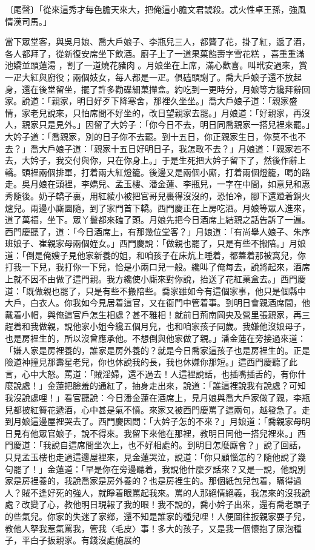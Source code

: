 \begin{showcontents}{}
〔尾聲〕「從來這秀才每色膽天來大，把俺這小膽文君諕殺。忒火性卓王孫，強風情漢司馬。」

當下眾堂客，與吳月娘、喬大戶娘子、李瓶兒三人，都籫了花，掛了紅，遞了酒，各人都拜了，從新復安席坐下飲酒。廚子上了一道果菓餡壽字雪花糕 ，喜重重滿池嬌並頭蓮湯 ，割了一道燒花豬肉 。月娘坐在上席，滿心歡喜。叫玳安過來，賞一疋大紅與廚役；兩個妓女，每人都是一疋。俱磕頭謝了。喬大戶娘子還不放起身，還在後堂留坐，擺了許多勸碟細菓攆盒。約吃到一更時分，月娘等方纔拜辭回家。說道：「親家，明日好歹下降寒舍，那裡久坐坐。」喬大戶娘子道：「親家盛情，家老兒說來，只怕席間不好坐的，改日望親家去罷。」月娘道：「好親家，再沒人，親家只是見外。」因留了大妗子：「你今日不去，明日同喬親家一搭兒裡來罷。」大妗子道：「喬親家，別的日子你不去罷。到十五日，你正親家生日，你莫不也不去？」喬大戶娘子道：「親家十五日好明日子，我怎敢不去？」月娘道：「親家若不去，大妗子，我交付與你，只在你身上。」于是生死把大妗子留下了，然後作辭上轎。頭裡兩個排軍，打着兩大紅燈籠。後邊又是兩個小廝，打着兩個燈籠，喝的路走。吳月娘在頭裡，李嬌兒、孟玉樓、潘金蓮、李瓶兒，一字在中間，如意兒和惠秀隨後。奶子轎子裏，用紅綾小被把官哥兒裹得沒沒的，恐怕冷，腳下還蹬着銅火爐兒。兩邊小廝圜隨，到了家門首下轎。西門慶正在上房吃酒。月娘等眾人進來，道了萬福，坐下。眾丫鬟都來磕了頭。月娘先把今日酒席上結親之話告訴了一遍。西門慶聽了，道：「今日酒席上，有那幾位堂客？」月娘道：「有尚舉人娘子、朱序班娘子、崔親家母兩個姪女。」西門慶說：「做親也罷了，只是有些不搬陪。」月娘道：「倒是俺嫂子見他家新養的姐，和咱孩子在床炕上睡着，都蓋着那被窩兒，你打我一下兒，我打你一下兒，恰是小兩口兒一般。纔叫了俺每去，說將起來，酒席上就不因不由做了這門親。我方纔使小廝來對你說，抬送了花紅菓盒去。」西門慶道：「既做親也罷了，只是有些不搬陪些。喬家雖如今有這個家事，他只是個縣中大戶，白衣人。你我如今見居着這官，又在衙門中管着事。到明日會親酒席間，他戴着小帽，與俺這官戶怎生相處？甚不雅相！就前日荊南岡央及營里張親家，再三趕着和我做親，說他家小姐今纔五個月兒，也和咱家孩子同歲。我嫌他沒娘母子，也是房裡生的，所以沒曾應承他。不想倒與他家做了親。」潘金蓮在旁接過來道：「嫌人家是房裡養的，誰家是房外養的？就是今日喬家這孩子也是房裡生的。正是險道神撞見那壽星老兒，你也休說我的長，我也休嫌你那短。」這西門慶聽了此言，心中大怒。罵道：「賊淫婦，還不過去！人這裡說話，也插嘴插舌的，有你什麼說處！」金蓮把臉羞的通紅了，抽身走出來，說道：「誰這裡說我有說處？可知我沒說處哩！」看官聽說：今日潘金蓮在酒席上，見月娘與喬大戶家做了親，李瓶兒都披紅籫花遞酒，心中甚是氣不憤。來家又被西門慶罵了這兩句，越發急了。走到月娘這邊屋裡哭去了。西門慶因問：「大妗子怎的不來？」月娘道：「喬親家母明日見有他眾官娘子，說不得來。我留下來他在那裡，教明日同他一搭兒裡來。」西門慶道：「我說自這席間坐次上，也不好相處的。到明日怎麼廝會？」說了回話，只見孟玉樓也走過這邊屋裡來，見金蓮哭泣，說道：「你只顧惱怎的？隨他說了幾句罷了！」金蓮道：「早是你在旁邊聽着，我說他什麼歹話來？又是一說，他說別家是房裡養的，我說喬家是房外養的？也是房裡生的。那個紙包兒包着，瞞得過人？賊不逢好死的強人，就睜着眼罵起我來。罵的人那絕情絕義，我怎來的沒我說處？改變了心，教他明日現報了我的眼！我不說的，喬小妗子出來，還有喬老頭子的些氣兒。你家的失迷了家鄉，還不知是誰家的種兒哩！人便圖往扳親家耍子兒，教他人拏我惹氣罵我，管我〈毛皮〉事！多大的孩子，又是我一個懷抱了尿泡種子，平白子扳親家。有錢沒處施展的
\end{showcontents}
